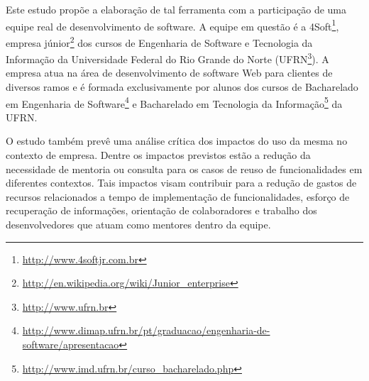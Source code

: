Este estudo propõe a elaboração de tal ferramenta com a participação de uma equipe real de desenvolvimento de software. A equipe em questão é a 4Soft\footnote{\url{http://www.4softjr.com.br}}, empresa júnior\footnote{\url{http://en.wikipedia.org/wiki/Junior_enterprise}} dos cursos de Engenharia de Software e Tecnologia da Informação da Universidade Federal do Rio Grande do Norte (UFRN\footnote{\url{http://www.ufrn.br}}). A empresa atua na área de desenvolvimento de software Web para clientes de diversos ramos e é formada exclusivamente por alunos dos cursos de Bacharelado em Engenharia de Software\footnote{\url{http://www.dimap.ufrn.br/pt/graduacao/engenharia-de-software/apresentacao}} e Bacharelado em Tecnologia da Informação\footnote{\url{http://www.imd.ufrn.br/curso_bacharelado.php}} da UFRN.

O estudo também prevê uma análise crítica dos impactos do uso da mesma no contexto de empresa. Dentre os impactos previstos estão a redução da necessidade de mentoria ou consulta para os casos de  reuso de funcionalidades em diferentes contextos. Tais impactos visam contribuir para a redução de gastos de recursos relacionados a tempo de implementação de funcionalidades, esforço de recuperação de informações, orientação de colaboradores e trabalho dos desenvolvedores que atuam como mentores dentro da equipe. 

